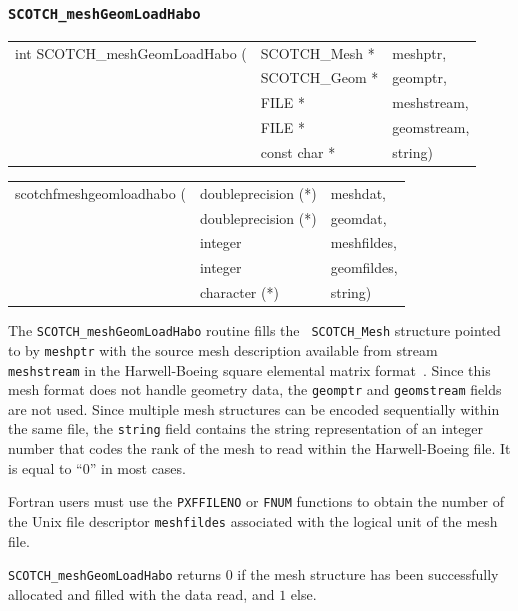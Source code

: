 \subsubsection{{\tt SCOTCH\_meshGeomLoadHabo}}

\begin{itemize}
\progsyn

{\tt\begin{tabular}{l@{}ll}
int SCOTCH\_meshGeomLoadHabo ( & SCOTCH\_Mesh * & meshptr, \\
                               & SCOTCH\_Geom * & geomptr, \\
                               & FILE *         & meshstream, \\
                               & FILE *         & geomstream, \\
                               & const char *   & string)
\end{tabular}}

{\tt\begin{tabular}{l@{}ll}
scotchfmeshgeomloadhabo ( & doubleprecision (*) & meshdat, \\
                          & doubleprecision (*) & geomdat, \\
                          & integer             & meshfildes, \\
                          & integer             & geomfildes, \\
                          & character (*)       & string)
\end{tabular}}

\progdes

The {\tt SCOTCH\_meshGeomLoadHabo} routine fills the {\tt
SCOTCH\_\lbt Mesh} structure pointed to by {\tt meshptr} with the
source mesh description available from stream {\tt mesh\lbt stream}
in the Harwell-Boeing square elemental matrix format~\cite{dugrle92}.
Since this mesh format does not handle geometry data, the
{\tt geomptr} and {\tt geom\lbt stream} fields are not used. Since
multiple mesh structures can be encoded sequentially within the same
file, the {\tt string} field contains the string representation of an
integer number that codes the rank of the mesh to read within the
Harwell-Boeing file. It is equal to ``0'' in most cases.

Fortran users must use the {\tt PXFFILENO} or {\tt FNUM} functions to
obtain the number of the Unix file descriptor {\tt mesh\lbt fildes}
associated with the logical unit of the mesh file.

\progret

{\tt SCOTCH\_meshGeomLoadHabo} returns $0$ if the mesh structure has
been successfully allocated and filled with the data read, and $1$ else.
\end{itemize}

